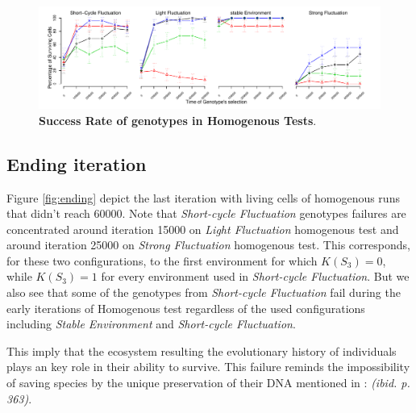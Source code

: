 \begin{figure}[h]
\centering
\includegraphics[width=2\columnwidth]{img/testSurvivingRates}
\caption{\textbf{Success Rate of genotypes in Homogenous Tests}.}
\label{fig:survrate}
\end{figure}

\subsection{Ending iteration}

Figure \ref{fig:ending} depict the last iteration with living cells of homogenous runs that didn't reach 60000. Note that \emph{Short-cycle Fluctuation} genotypes failures are concentrated around iteration 15000 on \emph{Light Fluctuation} homogenous test and around iteration 25000 on \emph{Strong Fluctuation} homogenous test. This corresponds, for these two configurations, to the first environment for which $K(S_3)=0$, while $K(S_3)=1$ for every environment used in \emph{Short-cycle Fluctuation}. But we also see that some of the genotypes from \emph{Short-cycle Fluctuation} fail during the early iterations of Homogenous test regardless of the used configurations including \emph{Stable Environment} and \emph{Short-cycle Fluctuation}.

This imply that the ecosystem resulting the evolutionary history of individuals plays an key role in their ability to survive. This failure reminds the impossibility of saving species by the unique preservation of their DNA mentioned in \cite{jablonka2014evolution}: \emph{(ibid. p. 363)}.

